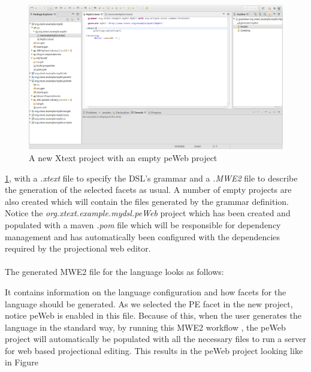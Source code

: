 \documentclass{article}
\begin{document}
\begin{figure}[h!]
  \includegraphics[width=\linewidth]{./Screenshots/newProjectScreen.png}
  \caption{A new Xtext project with an empty peWeb project}
  \label{fig:newProjectScreen}
\end{figure} \ref{fig:newProjectScreen}, with a \emph{.xtext} file to specify the DSL's grammar and a \emph{.MWE2} file to describe the generation of the selected facets as usual. A number of empty projects are also created which will contain the files generated by the grammar definition. Notice the \emph{org.xtext.example.mydsl.peWeb} project which has been created and populated with a maven \emph{.pom} file which will be responsible for dependency management and has automatically been configured with the dependencies required by the projectional web editor. 
\\
\\
The generated MWE2 file for the language looks as follows:

It contains information on the language configuration and how facets for the language should be generated. As we selected the PE facet in the new project, notice peWeb is enabled in this file. Because of this, when the user generates the language in the standard way, by running this MWE2 workflow , the peWeb project will automatically be populated with all the necessary files to run a server for web based projectional editing. This results in the peWeb project looking like in Figure 
\end{document}
